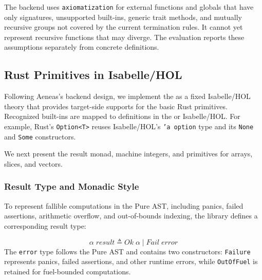 The backend uses \texttt{axiomatization} for external functions and globals that have only signatures, unsupported built-ins, generic trait methods, and mutually recursive groups not covered by the current termination rules.
It cannot yet represent recursive functions that may diverge.
The evaluation reports these assumptions separately from concrete definitions.


\subsection{Rust Primitives in Isabelle/HOL}
\label{sec:primitives}

Following Aeneas's backend design, we implement the \rprelude{} as a fixed Isabelle/HOL theory that provides target-side supports for the basic Rust primitives.
Recognized built-ins are mapped to definitions in the \rprelude{} or Isabelle/HOL. For example, Rust's \texttt{Option<T>} reuses Isabelle/HOL's \texttt{'a option} type and its \texttt{None} and \texttt{Some} constructors.

We next present the result monad, machine integers, and primitives for arrays, slices, and vectors.



\subsubsection{Result Type and Monadic Style} To represent fallible computations in the Pure AST, including panics, failed assertions, arithmetic overflow, and out-of-bounds indexing, the \rprelude{} library defines a corresponding result type: 

\begin{equation}
  \alpha\;\mathit{result}
  \triangleq \mathit{Ok}\;\alpha
  \mid \mathit{Fail}\;\mathit{error}
  \label{eq:result}
\end{equation}
The \texttt{error} type follows the Pure AST and contains two constructors: \texttt{Failure} represents panics, failed assertions, and other runtime errors, while \texttt{OutOfFuel} is retained for fuel-bounded computations.

